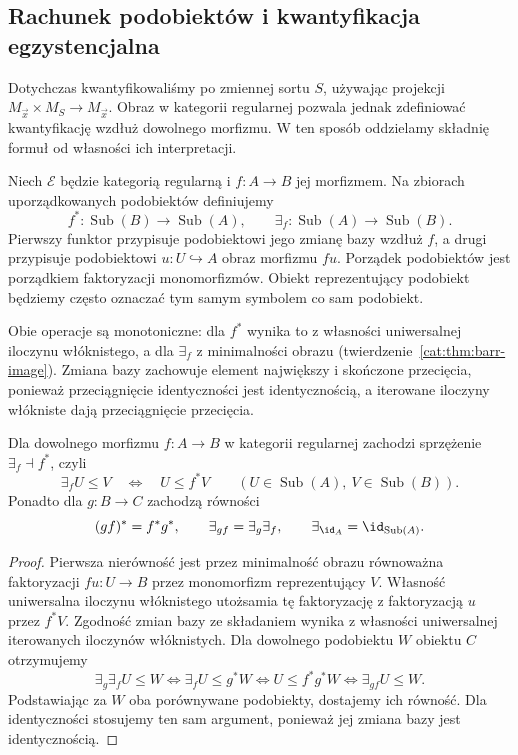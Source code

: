 \subsection{Rachunek podobiektów i kwantyfikacja egzystencjalna}

Dotychczas kwantyfikowaliśmy po zmiennej sortu $S$, używając projekcji $M_{\vec x}\times M_S\to M_{\vec x}$. Obraz w kategorii regularnej pozwala jednak zdefiniować kwantyfikację wzdłuż dowolnego morfizmu. W ten sposób oddzielamy składnię formuł od własności ich interpretacji.

\begin{definicja}\label{cat:def:cl-subobject-operations}
Niech $\mathcal E$ będzie kategorią regularną i $f:A\to B$ jej morfizmem. Na zbiorach uporządkowanych podobiektów definiujemy
\[
 f^*:\operatorname{Sub}(B)\to\operatorname{Sub}(A),
 \qquad
 \exists_f:\operatorname{Sub}(A)\to\operatorname{Sub}(B).
\]
Pierwszy funktor przypisuje podobiektowi jego zmianę bazy wzdłuż $f$, a drugi przypisuje podobiektowi $u:U\hookrightarrow A$ obraz morfizmu $fu$. Porządek podobiektów jest porządkiem faktoryzacji monomorfizmów. Obiekt reprezentujący podobiekt będziemy często oznaczać tym samym symbolem co sam podobiekt.
\end{definicja}

Obie operacje są monotoniczne: dla $f^*$ wynika to z własności uniwersalnej iloczynu włóknistego, a dla $\exists_f$ z minimalności obrazu (twierdzenie~\ref{cat:thm:barr-image}). Zmiana bazy zachowuje element największy i skończone przecięcia, ponieważ przeciągnięcie identyczności jest identycznością, a iterowane iloczyny włókniste dają przeciągnięcie przecięcia.

\begin{twierdzenie}\label{cat:thm:cl-exists-adjoint}
Dla dowolnego morfizmu $f:A\to B$ w kategorii regularnej zachodzi sprzężenie $\exists_f\dashv f^*$, czyli
\[
 \exists_f U\leq V\quad\Longleftrightarrow\quad U\leq f^*V
 \qquad
 (U\in\operatorname{Sub}(A),\ V\in\operatorname{Sub}(B)).
\]
Ponadto dla $g:B\to C$ zachodzą równości
\[
 (gf)^*=f^*g^*,\qquad \exists_{gf}=\exists_g\exists_f,
 \qquad \exists_{\id_A}=\id_{\operatorname{Sub}(A)}.
\]
\end{twierdzenie}
\begin{proof}
Pierwsza nierówność jest przez minimalność obrazu równoważna faktoryzacji $fu:U\to B$ przez monomorfizm reprezentujący $V$. Własność uniwersalna iloczynu włóknistego utożsamia tę faktoryzację z faktoryzacją $u$ przez $f^*V$. Zgodność zmian bazy ze składaniem wynika z własności uniwersalnej iterowanych iloczynów włóknistych. Dla dowolnego podobiektu $W$ obiektu $C$ otrzymujemy
\[
 \exists_g\exists_f U\leq W
 \iff \exists_f U\leq g^*W
 \iff U\leq f^*g^*W
 \iff \exists_{gf}U\leq W.
\]
Podstawiając za $W$ oba porównywane podobiekty, dostajemy ich równość. Dla identyczności stosujemy ten sam argument, ponieważ jej zmiana bazy jest identycznością.
\end{proof}

